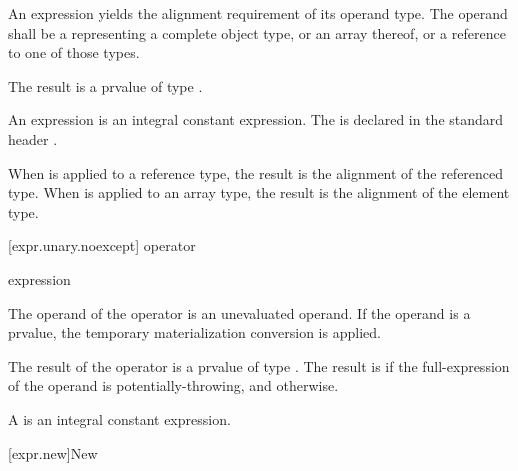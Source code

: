 \pnum
{}%
%
An  expression yields the alignment requirement
of its operand type. The operand shall be a 
representing a complete object type, or an array thereof, or a reference
to one of those types.

\pnum
The result is a prvalue of type .
\begin{note}
An  expression
is an integral constant expression.
The   is declared in the standard header
.
\end{note}

\pnum
When  is applied to a reference type, the result
is the alignment of the referenced type. When 
is applied to an array type, the result is the alignment of the
element type.

[expr.unary.noexcept]{ operator}

%
%

\begin{bnf}
\br
   \terminal{(} expression \terminal{)}
\end{bnf}

\pnum
The operand of the  operator
is an unevaluated operand.
If the operand is a prvalue,
the temporary materialization conversion is applied.

\pnum
The result of the  operator is a prvalue of type .
The result is  if
the full-expression of the operand is potentially-throwing, and
 otherwise.
\begin{note}
A 
is an integral constant expression.
\end{note}

[expr.new]{New}

